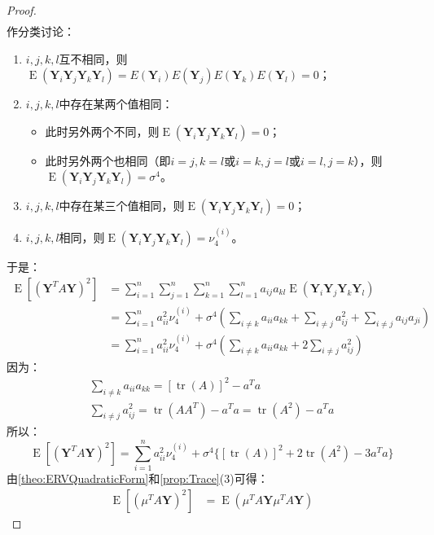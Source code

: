 \begin{proof}
\begin{align*}
	\end{align*}
	作分类讨论：
	\begin{enumerate}
		\item $i,j,k,l$互不相同，则$\operatorname{E}(\mathbf{Y}_i\mathbf{Y}_j\mathbf{Y}_k\mathbf{Y}_l)=E(\mathbf{Y}_i)E(\mathbf{Y}_j)E(\mathbf{Y}_k)E(\mathbf{Y}_l)=0$；
		\item $i,j,k,l$中存在某两个值相同：
		\begin{itemize}
			\item 此时另外两个不同，则$\operatorname{E}(\mathbf{Y}_i\mathbf{Y}_j\mathbf{Y}_k\mathbf{Y}_l)=0$；
			\item 此时另外两个也相同（即$i=j,k=l$或$i=k,j=l$或$i=l,j=k$），则$\operatorname{E}(\mathbf{Y}_i\mathbf{Y}_j\mathbf{Y}_k\mathbf{Y}_l)=\sigma^4$。
		\end{itemize}
		\item $i,j,k,l$中存在某三个值相同，则$\operatorname{E}(\mathbf{Y}_i\mathbf{Y}_j\mathbf{Y}_k\mathbf{Y}_l)=0$；
		\item $i,j,k,l$相同，则$\operatorname{E}(\mathbf{Y}_i\mathbf{Y}_j\mathbf{Y}_k\mathbf{Y}_l)=\nu_4^{(i)}$。
	\end{enumerate}
	于是：
	\begin{align*}
		\operatorname{E}[(\mathbf{Y}^TA\mathbf{Y})^2]
		&=\sum_{i=1}^{n}\sum_{j=1}^{n}\sum_{k=1}^{n}\sum_{l=1}^{n}a_{ij}a_{kl}\operatorname{E}(\mathbf{Y}_i\mathbf{Y}_j\mathbf{Y}_k\mathbf{Y}_l) \\
		&=\sum_{i=1}^{n}a_{ii}^2\nu_4^{(i)}+\sigma^4\left(\sum_{i\ne k}a_{ii}a_{kk}+\sum_{i\ne j}a_{ij}^2+\sum_{i\ne j}a_{ij}a_{ji}\right) \\
		&=\sum_{i=1}^{n}a_{ii}^2\nu_4^{(i)}+\sigma^4\left(\sum_{i\ne k}a_{ii}a_{kk}+2\sum_{i\ne j}a_{ij}^2\right)
	\end{align*}
	因为：
	\begin{gather*}
		\sum_{i\ne k}a_{ii}a_{kk}=[\operatorname{tr}(A)]^2-a^Ta \\
		\sum_{i\ne j}a_{ij}^2=\operatorname{tr}(AA^T)-a^Ta=\operatorname{tr}(A^2)-a^Ta
	\end{gather*}
	所以：
	\begin{equation*}
		\operatorname{E}[(\mathbf{Y}^TA\mathbf{Y})^2]=\sum_{i=1}^{n}a_{ii}^2\nu_4^{(i)}+\sigma^4\{[\operatorname{tr}(A)]^2+2\operatorname{tr}(A^2)-3a^Ta\}
	\end{equation*}
	由\cref{theo:ERVQuadraticForm}和\cref{prop:Trace}(3)可得：
	\begin{align*}
		\operatorname{E}[(\mu^TA\mathbf{Y})^2]
		&=\operatorname{E}(\mu^TA\mathbf{Y}\mu^TA\mathbf{Y})

\end{align*}
\end{proof}
